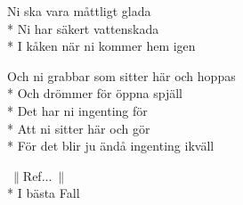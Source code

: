 \begin{SongVerse}[Pessemistkonsulten]
\begin{SongVerse}
        Ni ska vara måttligt glada\\*%
        Ni har säkert vattenskada\\*%
        I kåken när ni kommer hem igen
    \end{SongVerse}
    \begin{SongVerse}
        Och ni grabbar som sitter här och hoppas\\*%
        Och drömmer för öppna spjäll\\*%
        Det har ni ingenting för\\*%
        Att ni sitter här och gör\\*%
        För det blir ju ändå ingenting ikväll
    \end{SongVerse}
    \begin{SongVerse}
        $\:\|$Ref...$\:\|$\\*%
        I bästa Fall
    \end{SongVerse}
\end{SongVerse}
\newpage
